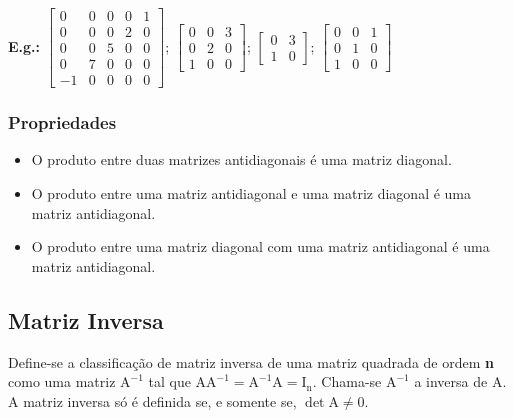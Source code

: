 \documentclass[a4paper,12pt]{article}
\begin{document}
\textbf{E.g.:} $\begin{bmatrix} 0 & 0 & 0 & 0 & 1 \\ 0 & 0 & 0 & 2 & 0 \\ 0 & 0 & 5 & 0 & 0 \\ 0 & 7 & 0 & 0 & 0 \\ -1 & 0 & 0 & 0 & 0 \end{bmatrix}$; $ \begin{bmatrix}
0 & 0 & 3\\
0 & 2 & 0\\
1 & 0 & 0
\end{bmatrix} $; $ \begin{bmatrix}
0 & 3\\
1 & 0
\end{bmatrix} $; $ \begin{bmatrix}
0 & 0 & 1\\
0 & 1 & 0\\
1 & 0 & 0
\end{bmatrix} $

\subsubsection{Propriedades}

\begin{itemize}

    \item O produto entre duas matrizes antidiagonais é uma matriz diagonal.

    \item O produto entre uma matriz antidiagonal e uma matriz diagonal é uma matriz antidiagonal.

    \item O produto entre uma matriz diagonal com uma matriz antidiagonal é uma matriz antidiagonal.

\end{itemize}

\subsection{Matriz Inversa}

Define-se a classificação de matriz inversa de uma matriz quadrada de ordem \textbf{n} como uma matriz $ \text{A}^{-1} $ tal que $ \text{A}\text{A}^{-1} = \text{A}^{-1}\text{A} = \text{I}_{\text{n}} $. Chama-se $ \text{A}^{-1} $ a inversa de $ \text{A} $. A matriz inversa só é definida se, e somente se, $ \det \text{A} \neq 0 $.
\end{document}
